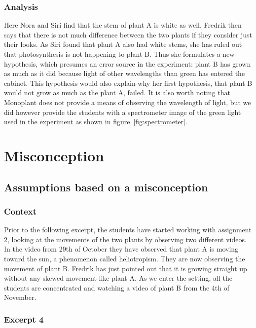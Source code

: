 \subsubsection*{Analysis}
Here Nora and Siri find that the stem of plant A is white as well. Fredrik then says that there is not much difference between the two plants if they consider just their looks. As Siri found that plant A also had white stems, she has ruled out that photosynthesis is not happening to plant B. Thus she formulates a new hypothesis, which presumes an error source in the experiment: plant B has grown as much as it did because light of other wavelengths than green has entered the cabinet.
This hypothesis would also explain why her first hypothesis, that plant B would not grow as much as the plant A, failed. It is also worth noting that Monoplant does not provide a means of observing the wavelength of light, but we did however provide the students with a spectrometer image of the green light used in the experiment as shown in figure~\ref{fig:spectrometer}.

\section{Misconception}
\label{cha:guidedinquiry}


\subsection{Assumptions based on a misconception}

\subsubsection*{Context}
Prior to the following excerpt, the students have started working with assignment 2, looking at the movements of the two plants by observing two different videos. In the video from 29th of October they have observed that plant A is moving toward the sun, a phenomenon called heliotropism. They are now observing the movement of plant B. Fredrik has just pointed out that it is growing straight up without any skewed movement like plant A. As we enter the setting, all the students are concentrated and watching a video of plant B from the 4th of November.


\subsubsection*{Excerpt 4}\label{ex:excerpt4}

